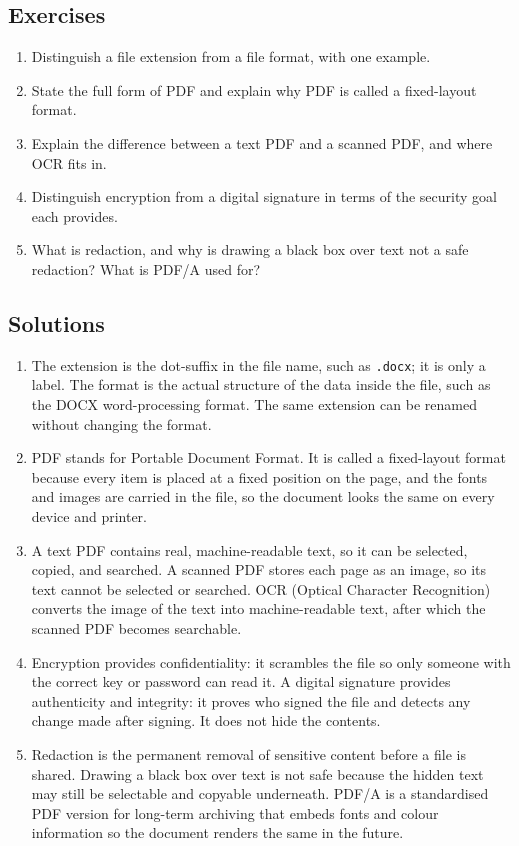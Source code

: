 \subsection*{Exercises}
\begin{enumerate}[label=\arabic*.]
  \item Distinguish a file extension from a file format, with one example.
  \item State the full form of PDF and explain why PDF is called a
    fixed-layout format.
  \item Explain the difference between a text PDF and a scanned PDF, and
    where OCR fits in.
  \item Distinguish encryption from a digital signature in terms of the
    security goal each provides.
  \item What is redaction, and why is drawing a black box over text not a
    safe redaction? What is PDF/A used for?
\end{enumerate}

\subsection*{Solutions}
\begingroup\small
\begin{enumerate}[label=\arabic*.]
  \item The extension is the dot-suffix in the file name, such as
    \texttt{.docx}; it is only a label. The format is the actual structure of
    the data inside the file, such as the DOCX word-processing format. The
    same extension can be renamed without changing the format.
  \item PDF stands for Portable Document Format. It is called a fixed-layout
    format because every item is placed at a fixed position on the page, and
    the fonts and images are carried in the file, so the document looks the
    same on every device and printer.
  \item A text PDF contains real, machine-readable text, so it can be
    selected, copied, and searched. A scanned PDF stores each page as an
    image, so its text cannot be selected or searched. OCR (Optical Character
    Recognition) converts the image of the text into machine-readable text,
    after which the scanned PDF becomes searchable.
  \item Encryption provides confidentiality: it scrambles the file so only
    someone with the correct key or password can read it. A digital signature
    provides authenticity and integrity: it proves who signed the file and
    detects any change made after signing. It does not hide the contents.
  \item Redaction is the permanent removal of sensitive content before a file
    is shared. Drawing a black box over text is not safe because the hidden
    text may still be selectable and copyable underneath. PDF/A is a
    standardised PDF version for long-term archiving that embeds fonts and
    colour information so the document renders the same in the future.
\end{enumerate}
\endgroup

